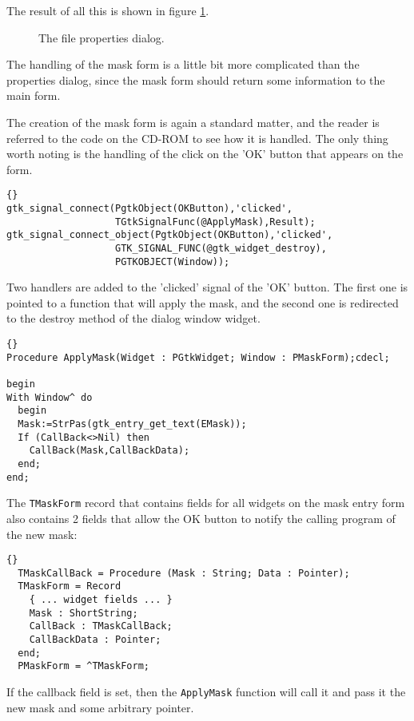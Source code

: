 \documentclass[10pt]{article}
\begin{document}
The result of all this is shown in figure \ref{fig:fileprops}.
\begin{figure}[ht]
\begin{center}
\caption{The file properties dialog.}\label{fig:fileprops}
\end{center}
\end{figure}

The handling of the mask form is a little bit more complicated than the
properties dialog, since the mask form should return some information
to the main form. 

The creation of the mask form is again a standard matter, and the reader 
is referred to the code on the CD-ROM to see how it is handled. The
only thing worth noting is the handling of the click on the 'OK' button that
appears on the form.
\begin{lstlisting}{}
gtk_signal_connect(PgtkObject(OKButton),'clicked',
                   TGtkSignalFunc(@ApplyMask),Result);
gtk_signal_connect_object(PgtkObject(OKButton),'clicked',
                   GTK_SIGNAL_FUNC(@gtk_widget_destroy),
                   PGTKOBJECT(Window));                                      
\end{lstlisting}
Two handlers are added to the 'clicked' signal of the 'OK' button.
The first one is pointed to a function that will apply the mask, and the
second one is redirected to the destroy method of the dialog window widget.
\begin{lstlisting}{}
Procedure ApplyMask(Widget : PGtkWidget; Window : PMaskForm);cdecl;
 
begin
With Window^ do
  begin
  Mask:=StrPas(gtk_entry_get_text(EMask));
  If (CallBack<>Nil) then
    CallBack(Mask,CallBackData);
  end;
end;
\end{lstlisting}
The \lstinline|TMaskForm| record that contains fields for all widgets on
the mask entry form also contains 2 fields that allow the OK button to notify 
the calling program of the new mask:
\begin{lstlisting}{}
  TMaskCallBack = Procedure (Mask : String; Data : Pointer);
  TMaskForm = Record
    { ... widget fields ... }
    Mask : ShortString;
    CallBack : TMaskCallBack;
    CallBackData : Pointer;
  end;
  PMaskForm = ^TMaskForm;                                                       
\end{lstlisting}
If the callback field is set, then the \lstinline|ApplyMask| function will call
it and pass it the new mask and some arbitrary pointer.
\end{document}
